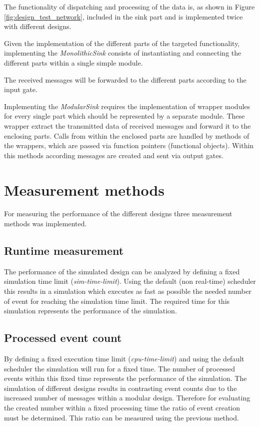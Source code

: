 The functionality of dispatching and processing of the data is, as shown in Figure \ref{fig:design_test_network}, included in the sink part and is implemented twice with different designs.


Given the implementation of the different parts of the targeted functionality, implementing the \emph{MonolithicSink} consists of instantiating and connecting the different parts within a single simple module.

The received messages will be forwarded to the different parts according to the input gate.

Implementing the \emph{ModularSink} requires the implementation of wrapper modules for every single part which should be represented by a separate module.
These wrapper extract the transmitted data of received messages and forward it to the enclosing parts.
Calls from within the enclosed parts are handled by methods of the wrappers, which are passed via function pointers (functional objects).
Within this methods according messages are created and sent via output gates.

\section{Measurement methods}
\label{sec:measurements_methods}
For measuring the performance of the different designs three measurement methods was implemented.

\subsection{Runtime measurement}
\label{sec:measurements_methods_runtime}
The performance of the simulated design can be analyzed by defining a fixed simulation time limit (\emph{sim-time-limit}).
Using the default (non real-time) scheduler this results in a simulation which executes as fast as possible the needed number of event for reaching the simulation time limit.
The required time for this simulation represents the performance of the simulation.

\subsection{Processed event count}
\label{sec:measurements_methods_event}
By defining a fixed execution time limit (\emph{cpu-time-limit}) and using the default scheduler the simulation will run for a fixed time.
The number of processed events within this fixed time represents the performance of the simulation.
The simulation of different designs results in contrasting event counts due to the increased number of messages within a modular design.
Therefore for evaluating the created number within a fixed processing time the ratio of event creation must be determined.
This ratio can be measured using the previous method.

